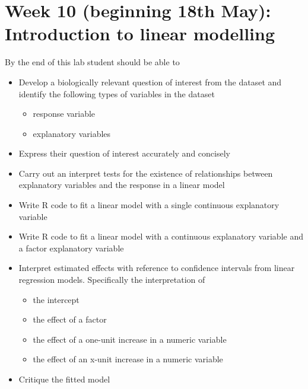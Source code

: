 \documentclass{article}
\begin{document}
\section*{Week 10 (beginning 18th May): Introduction to linear modelling}
By the end of this lab student should be able to
\begin{itemize}
\item Develop a biologically relevant question of interest  from the dataset and identify the following types of variables in the dataset
  \begin{itemize}
  \item response variable
  \item explanatory variables
  \end{itemize}
\item Express their question of interest accurately and concisely
\item Carry out an interpret tests for the existence of relationships between explanatory variables and the response in a linear model
\item Write R code to fit a linear model with a single continuous explanatory variable
\item Write R code to fit a linear model with a continuous explanatory variable and a factor explanatory variable
\item Interpret estimated effects with reference to confidence intervals from linear regression models. Specifically the interpretation of
  \begin{itemize}
  \item the intercept
  \item the effect of a factor
  \item the effect of a one-unit increase in a numeric variable
  \item the effect of an x-unit increase in a numeric variable
  \end{itemize}
\item Critique the fitted model
\end{itemize}
\end{document}
